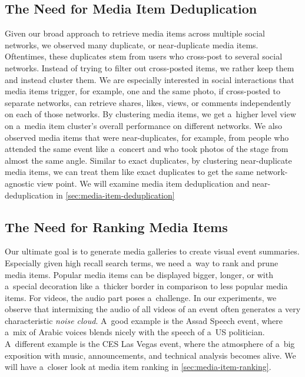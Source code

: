 \subsection{The Need for Media Item Deduplication}
\label{sec:the-need-for-media-item-deduplication}

Given our broad approach to retrieve media items
across multiple social networks,
we observed many duplicate, or near-duplicate media items.
Oftentimes, these duplicates stem from users who
cross-post to several social networks.
Instead of trying to filter out cross-posted items,
we rather keep them and instead cluster them.
We are especially interested in social interactions
that media items trigger, for example, one and the same 
photo, if cross-posted to separate networks, can retrieve
shares, likes, views, or comments independently
on each of those networks.
By clustering media items, we get a~higher level view on
a~media item cluster's overall performance on different networks.
We also observed media items that were near-duplicates,
for example, from people who attended the same event like a~concert
and who took photos of the stage from almost the same angle.
Similar to exact duplicates,
by clustering near-duplicate media items,
we can treat them like exact duplicates to get the same
network-agnostic view point.
We will examine media item deduplication and near-deduplication
in \autoref{sec:media-item-deduplication}

\subsection{The Need for Ranking Media Items}

Our ultimate goal is to generate media galleries
to create visual event summaries.
Especially given high recall search terms,
we need a~way to rank and prune media items.
Popular media items can be displayed bigger, longer,
or with a~special decoration like a~thicker border
in comparison to less popular media items.
For videos, the audio part poses a~challenge.
In our experiments, we observe that intermixing the audio
of all videos of an event often generates
a very characteristic \emph{noise cloud}.
A~good example is the Assad Speech event,
where a~mix of Arabic voices blends nicely
with the speech of a~US politician.
A~different example is the CES Las Vegas event,
where the atmosphere of a~big exposition with music,
announcements, and technical analysis becomes alive.
We will have a~closer look at media item ranking in
\autoref{sec:media-item-ranking}.

